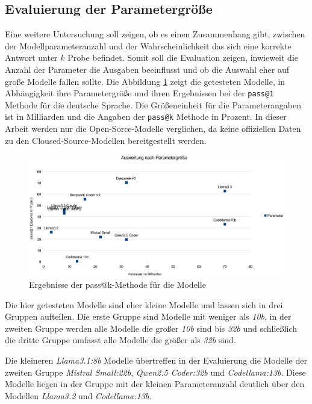 \subsection{Evaluierung der Parametergröße}
Eine weitere Untersuchung soll zeigen, ob es einen Zusammenhang gibt, zwischen der Modellparameteranzahl und der Wahrscheinlichkeit das sich eine korrekte Antwort unter $k$ Probe befindet. Somit soll die Evaluation zeigen, inwieweit die Anzahl der Parameter die Ausgaben beeinflusst und ob die Auswahl eher auf große Modelle fallen sollte. Die Abbildung \ref{img:results_by_llm_param} zeigt die getesteten Modelle, in Abhängigkeit ihre Parametergröße und ihren Ergebnissen bei der \texttt{pass@1} Methode für die deutsche Sprache. Die Größeneinheit für die Parameterangaben ist in Milliarden und die Angaben der \texttt{pass@k} Methode in Prozent. In dieser Arbeit werden nur die Open-Sorce-Modelle verglichen, da keine offiziellen Daten zu den Cloused-Source-Modellen bereitgestellt werden.\vspace{0.2cm}

\begin{figure}[!ht]
	\includegraphics[width=\textwidth]{content/chapter_evaluation/images/llm_evaluation_param.eps}
	\centering
	\caption{Ergebnisse der pass@k-Methode für die Modelle}
	\label{img:results_by_llm_param}
\end{figure}

Die hier getesteten Modelle sind eher kleine Modelle und lassen sich in drei Gruppen aufteilen. Die erste Gruppe sind Modelle mit weniger als \textit{10b}, in der zweiten Gruppe werden alle Modelle die großer \textit{10b} sind bis \textit{32b} und schließlich die dritte Gruppe umfasst alle Modelle die größer als \textit{32b} sind.\vspace{0.2cm}

Die kleineren \textit{Llama3.1:8b} Modelle übertreffen in der Evaluierung die Modelle der zweiten Gruppe \textit{Mistral Small:22b}, \textit{Qwen2.5 Coder:32b} und \textit{Codellama:13b}. Diese Modelle liegen in der Gruppe mit der kleinen Parameteranzahl deutlich über den Modellen \textit{Llama3.2} und \textit{Codellama:13b}.\vspace{0.2cm}

